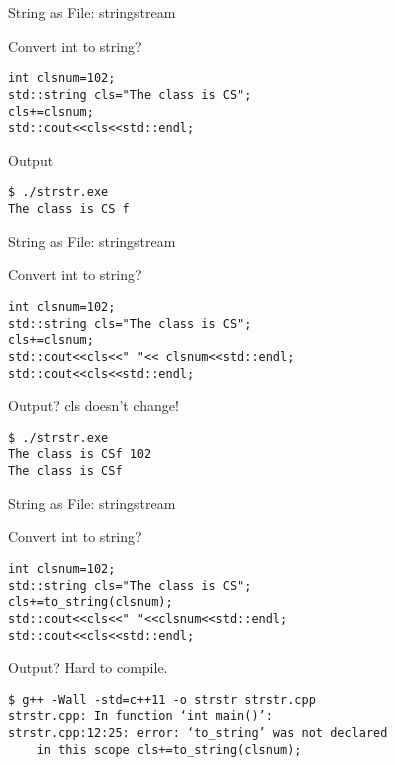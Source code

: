 \documentclass[xcolor={dvipsnames}]{beamer}
\begin{document}
\begin{frame}[fragile]{String as File: stringstream}
\begin{block}{Convert int to string?}
\begin{verbatim}
int clsnum=102;
std::string cls="The class is CS";
cls+=clsnum;
std::cout<<cls<<std::endl;
\end{verbatim}
\end{block}

\begin{block}{Output}
\begin{verbatim}
$ ./strstr.exe
The class is CS f
\end{verbatim}
\end{block}
\end{frame}

\begin{frame}[fragile]{String as File: stringstream}
\begin{block}{Convert int to string?}
\begin{verbatim}
int clsnum=102;
std::string cls="The class is CS";
cls+=clsnum;
std::cout<<cls<<" "<< clsnum<<std::endl;
std::cout<<cls<<std::endl;
\end{verbatim}
\end{block}

\begin{block}{Output? cls doesn't change!}
\begin{verbatim}
$ ./strstr.exe
The class is CSf 102
The class is CSf
\end{verbatim}
\end{block}
\end{frame}

\begin{frame}[fragile]{String as File: stringstream}
\begin{block}{Convert int to string?}
\begin{verbatim}
int clsnum=102;
std::string cls="The class is CS";
cls+=to_string(clsnum);
std::cout<<cls<<" "<<clsnum<<std::endl;
std::cout<<cls<<std::endl;
\end{verbatim}
\end{block}

\begin{block}{Output? Hard to compile.}
\begin{verbatim}
$ g++ -Wall -std=c++11 -o strstr strstr.cpp
strstr.cpp: In function ‘int main()’:
strstr.cpp:12:25: error: ‘to_string’ was not declared 
    in this scope cls+=to_string(clsnum);
\end{verbatim}
\end{block}
\end{frame}
\end{document}
